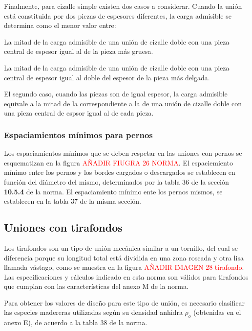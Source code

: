 Finalmente, para cizalle simple existen dos casos a considerar. Cuando la unión está constituida por dos piezas de espesores diferentes, la carga admisible se determina como el menor valor entre:
\begin{itemize*}
	\item La mitad de la carga admisible de una unión de cizalle doble con una pieza central de espesor igual al de la pieza más gruesa.
	\item La mitad de la carga admisible de una unión de cizalle doble con una pieza central de espesor igual al doble del espesor de la pieza más delgada.
\end{itemize*}
El segundo caso, cuando las piezas son de igual espesor, la carga admisible equivale a la mitad de la correspondiente a la de una unión de cizalle doble con una pieza central de espsor igual al de cada pieza.

\subsubsection{Espaciamientos mínimos para pernos}
Los espaciamientos mínimos que se deben respetar en las uniones con pernos se esquematizan en la figura \textcolor{red}{AÑADIR FIUGRA 26 NORMA}. El espaciemiento mínimo entre los pernos y los bordes cargados o descargados se establecen en función del diámetro del mismo, determinados por la tabla 36 de la sección \textbf{10.5.4} de la norma. El espaciamiento mínimo ente los pernos mismos, se establecen en la tabla 37 de la misma sección. 

\subsection{Uniones con tirafondos}
Los tirafondos son un tipo de unión mecánica similar a un tornillo, del cual se diferencia porque su longitud total está dividida en una zona roscada y otra lisa llamada vástago, como se muestra en la figura \textcolor{red}{AÑADIR IMAGEN 28 tirafondo}. Las especificaciones y cálculos indicado en esta norma son válidos para tirafondos que cumplan con las características del anexo M de la norma.

Para obtener los valores de diseño para este tipo de unión, es necesario clasificar las especies madereras utilizadas según su densidad anhidra $\rho_o$ (obtenidas en el anexo E), de acuerdo a la tabla 38 de la norma.


